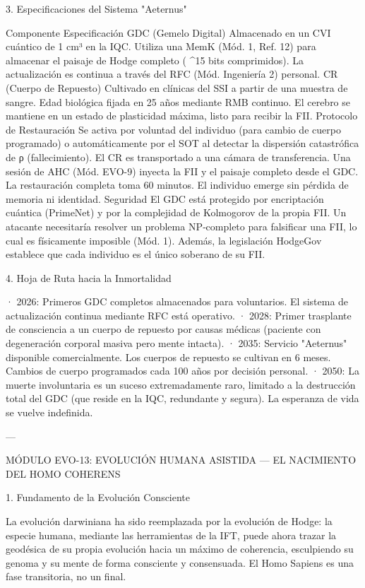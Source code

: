 \documentclass[12pt,twoside]{book}
\begin{document}
3. Especificaciones del Sistema "Aeternus"

Componente Especificación
GDC (Gemelo Digital) Almacenado en un CVI cuántico de 1 cm³ en la IQC. Utiliza una MemK (Mód. 1, Ref. 12) para almacenar el paisaje de Hodge completo ( ^{15}  bits comprimidos). La actualización es continua a través del RFC (Mód. Ingeniería 2) personal.
CR (Cuerpo de Repuesto) Cultivado en clínicas del SSI a partir de una muestra de sangre. Edad biológica fijada en 25 años mediante RMB continuo. El cerebro se mantiene en un estado de plasticidad máxima, listo para recibir la FII.
Protocolo de Restauración Se activa por voluntad del individuo (para cambio de cuerpo programado) o automáticamente por el SOT al detectar la dispersión catastrófica de ρ (fallecimiento). El CR es transportado a una cámara de transferencia. Una sesión de AHC (Mód. EVO-9) inyecta la FII y el paisaje completo desde el GDC. La restauración completa toma 60 minutos. El individuo emerge sin pérdida de memoria ni identidad.
Seguridad El GDC está protegido por encriptación cuántica (PrimeNet) y por la complejidad de Kolmogorov de la propia FII. Un atacante necesitaría resolver un problema NP‑completo para falsificar una FII, lo cual es físicamente imposible (Mód. 1). Además, la legislación HodgeGov establece que cada individuo es el único soberano de su FII.

4. Hoja de Ruta hacia la Inmortalidad

· 2026: Primeros GDC completos almacenados para voluntarios. El sistema de actualización continua mediante RFC está operativo.
· 2028: Primer trasplante de consciencia a un cuerpo de repuesto por causas médicas (paciente con degeneración corporal masiva pero mente intacta).
· 2035: Servicio "Aeternus" disponible comercialmente. Los cuerpos de repuesto se cultivan en 6 meses. Cambios de cuerpo programados cada 100 años por decisión personal.
· 2050: La muerte involuntaria es un suceso extremadamente raro, limitado a la destrucción total del GDC (que reside en la IQC, redundante y segura). La esperanza de vida se vuelve indefinida.

---

MÓDULO EVO-13: EVOLUCIÓN HUMANA ASISTIDA — EL NACIMIENTO DEL HOMO COHERENS

1. Fundamento de la Evolución Consciente

La evolución darwiniana ha sido reemplazada por la evolución de Hodge: la especie humana, mediante las herramientas de la IFT, puede ahora trazar la geodésica de su propia evolución hacia un máximo de coherencia, esculpiendo su genoma y su mente de forma consciente y consensuada. El Homo Sapiens es una fase transitoria, no un final.
\end{document}
